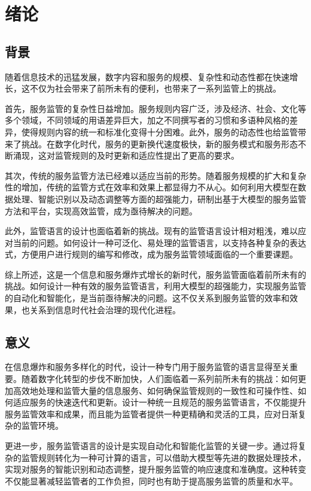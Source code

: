 \cleardoublepage

\section{绪论}

\subsection{背景}

随着信息技术的迅猛发展，数字内容和服务的规模、复杂性和动态性都在快速增长，这不仅为社会带来了前所未有的便利，也带来了一系列监管上的挑战。

首先，服务监管的复杂性日益增加。服务规则内容广泛，涉及经济、社会、文化等多个领域，不同领域的用语差异巨大，加之不同撰写者的习惯和多语种风格的差异，使得规则内容的统一和标准化变得十分困难。此外，服务的动态性也给监管带来了挑战。在数字化时代，服务的更新换代速度极快，新的服务模式和服务形态不断涌现，这对监管规则的及时更新和适应性提出了更高的要求。

其次，传统的服务监管方法已经难以适应当前的形势。随着服务规模的扩大和复杂性的增加，传统的监管方式在效率和效果上都显得力不从心。如何利用大模型在数据处理、智能识别以及动态调整等方面的超强能力，研制出基于大模型的服务监管方法和平台，实现高效监管，成为亟待解决的问题。

此外，监管语言的设计也面临着新的挑战。现有的监管语言设计相对粗浅，难以应对当前的问题。如何设计一种可泛化、易处理的监管语言，以支持各种复杂的表达式，方便用户进行规则的编写和修改，成为服务监管领域面临的一个重要课题。

综上所述，这是一个信息和服务爆炸式增长的新时代，服务监管面临着前所未有的挑战。如何设计一种有效的服务监管语言，利用大模型的超强能力，实现服务监管的自动化和智能化，是当前亟待解决的问题。这不仅关系到服务监管的效率和效果，也关系到信息时代社会治理的现代化进程。


\subsection{意义}

在信息爆炸和服务多样化的时代，设计一种专门用于服务监管的语言显得至关重要。随着数字化转型的步伐不断加快，人们面临着一系列前所未有的挑战：如何更加高效地处理和监管大量的信息服务、如何确保监管规则的一致性和可操作性、如何适应服务的快速迭代和更新。设计一种统一且规范的服务监管语言，不仅能提升服务监管效率和成果，而且能为监管者提供一种更精确和灵活的工具，应对日渐复杂的监管环境。

更进一步，服务监管语言的设计是实现自动化和智能化监管的关键一步。通过将复杂的监管规则转化为一种可计算的语言，可以借助大模型等先进的数据处理技术，实现对服务的智能识别和动态调整，提升服务监管的响应速度和准确度。这种转变不仅能显著减轻监管者的工作负担，同时也有助于提高服务监管的质量和水平。

